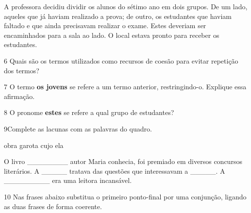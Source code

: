 \begin{myquote}

A professora decidiu dividir os alunos do sétimo ano em dois grupos. De um
lado, aqueles que já haviam realizado a prova; de outro, os estudantes que
haviam faltado e que ainda precisavam realizar o exame. Estes deveriam
ser encaminhados para a sala ao lado. O local estava pronto para receber
os estudantes.

\end{myquote}

\num{6} Quais são os termos utilizados como recursos de coesão para
evitar repetição dos termos? 


\num{7} O termo \textbf{os jovens} se refere a um termo anterior, restringindo-o. 
Explique essa afirmação.


\num{8} O pronome \textbf{estes} se refere a qual grupo de estudantes?


\num{9}Complete as lacunas com as palavras do quadro.

\begin{myquote}

obra garota cujo ela

\end{myquote}

O livro \_\_\_\_\_\_\_\_ autor Maria conhecia, foi premiado em diversos
concursos literários. A \_\_\_\_\_ tratava das questões que interessavam
a \_\_\_\_\_. A \_\_\_\_\_\_\_\_\_ era uma leitora incansável.


\num{10} Nas frases abaixo substitua o primeiro ponto-final por uma conjunção,
ligando as duas frases de forma coerente. 

